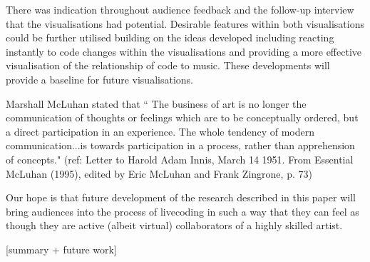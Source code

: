 \documentclass{sig-alternate}
\begin{document}
There was indication throughout audience feedback and the follow-up interview that the visualisations had potential. Desirable features within both visualisations could be further utilised building on the ideas developed including reacting instantly to code changes within the visualisations and providing a more effective visualisation of the relationship of code to music. These developments will provide a baseline for future visualisations.

Marshall McLuhan stated that ``
The business of art is no longer the communication of thoughts or feelings which are to be conceptually ordered, but a direct participation in an experience. The whole tendency of modern communication...is towards participation in a process, rather than apprehension of concepts." (ref: Letter to Harold Adam Innis, March 14 1951. From Essential McLuhan (1995), edited by Eric McLuhan and Frank Zingrone, p. 73)

Our hope is that future development of the research described in this paper will bring audiences into the process of livecoding in such a way that they can feel as though they are active (albeit virtual) collaborators of a highly skilled artist.

{\color{red}[summary + future work]}



\end{document}
